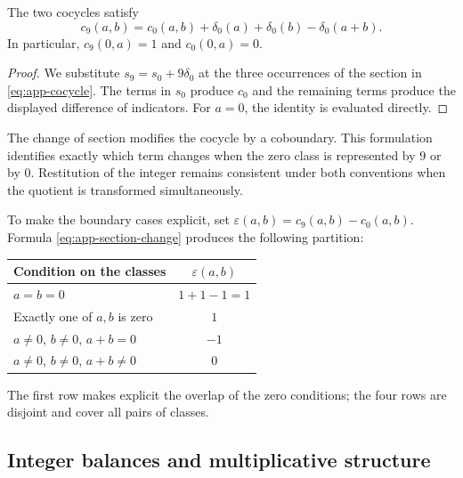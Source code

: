 \begin{bloqueindivisible}
\begin{proposicion}
\label{prop:app-cambio-seccion}
The two cocycles satisfy
\begin{equation}
 c_9(a,b)=c_0(a,b)+\delta_0(a)+\delta_0(b)-\delta_0(a+b).
 \label{eq:app-section-change}
\end{equation}
In particular, $c_9(0,a)=1$ and $c_0(0,a)=0$.
\end{proposicion}

\begin{proof}
We substitute $s_9=s_0+9\delta_0$ at the three occurrences of the section in \eqref{eq:app-cocycle}. The terms in $s_0$ produce $c_0$ and the remaining terms produce the displayed difference of indicators. For $a=0$, the identity is evaluated directly.
\end{proof}
\end{bloqueindivisible}

The change of section modifies the cocycle by a coboundary. This formulation identifies exactly which term changes when the zero class is represented by $9$ or by $0$. Restitution of the integer remains consistent under both conventions when the quotient is transformed simultaneously.

To make the boundary cases explicit, set $\varepsilon(a,b)=c_9(a,b)-c_0(a,b)$. Formula \eqref{eq:app-section-change} produces the following partition:
\begin{tablacompleta}[H]
\caption{Correction of the carry under a change of section.}
\label{tab:app-casos-seccion}
\begin{tabular}{lc}
\toprule
Condition on the classes & $\varepsilon(a,b)$\\
\midrule
$a=b=0$ & $1+1-1=1$\\
Exactly one of $a,b$ is zero & $1$\\
$a\neq0$, $b\neq0$, $a+b=0$ & $-1$\\
$a\neq0$, $b\neq0$, $a+b\neq0$ & $0$\\
\bottomrule
\end{tabular}
\end{tablacompleta}
The first row makes explicit the overlap of the zero conditions; the four rows are disjoint and cover all pairs of classes.

\subsection{Integer balances and multiplicative structure}
\label{sec:app-balances}


